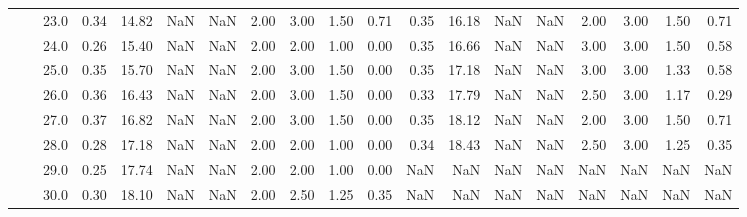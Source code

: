 \begin{tabular}{lllrrrrrrrrrrrrrrrr}
       &     & 23.0 &      0.34 &      14.82 &               NaN &                NaN & 2.00 &   3.00 &             1.50 &                         0.71 &      0.35 &      16.18 &               NaN &                NaN & 2.00 &   3.00 &             1.50 &                         0.71 \\
       &     & 24.0 &      0.26 &      15.40 &               NaN &                NaN & 2.00 &   2.00 &             1.00 &                         0.00 &      0.35 &      16.66 &               NaN &                NaN & 3.00 &   3.00 &             1.50 &                         0.58 \\
       &     & 25.0 &      0.35 &      15.70 &               NaN &                NaN & 2.00 &   3.00 &             1.50 &                         0.00 &      0.35 &      17.18 &               NaN &                NaN & 3.00 &   3.00 &             1.33 &                         0.58 \\
       &     & 26.0 &      0.36 &      16.43 &               NaN &                NaN & 2.00 &   3.00 &             1.50 &                         0.00 &      0.33 &      17.79 &               NaN &                NaN & 2.50 &   3.00 &             1.17 &                         0.29 \\
       &     & 27.0 &      0.37 &      16.82 &               NaN &                NaN & 2.00 &   3.00 &             1.50 &                         0.00 &      0.35 &      18.12 &               NaN &                NaN & 2.00 &   3.00 &             1.50 &                         0.71 \\
       &     & 28.0 &      0.28 &      17.18 &               NaN &                NaN & 2.00 &   2.00 &             1.00 &                         0.00 &      0.34 &      18.43 &               NaN &                NaN & 2.50 &   3.00 &             1.25 &                         0.35 \\
       &     & 29.0 &      0.25 &      17.74 &               NaN &                NaN & 2.00 &   2.00 &             1.00 &                         0.00 &       NaN &        NaN &               NaN &                NaN &  NaN &    NaN &              NaN &                          NaN \\
       &     & 30.0 &      0.30 &      18.10 &               NaN &                NaN & 2.00 &   2.50 &             1.25 &                         0.35 &       NaN &        NaN &               NaN &                NaN &  NaN &    NaN &              NaN &                          NaN \\

\end{tabular}
